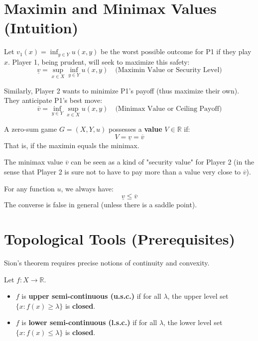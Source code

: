 \section{Maximin and Minimax Values (Intuition)}

Let $v_1(x) = \inf_{y \in Y} u(x, y)$ be the worst possible outcome for P1 if they play $x$.
Player 1, being prudent, will seek to maximize this safety:
$$\underline{v} = \sup_{x \in X} \inf_{y \in Y} u(x, y) \quad \text{(Maximin Value or Security Level)}$$

Similarly, Player 2 wants to minimize P1's payoff (thus maximize their own). They anticipate P1's best move:
$$\overline{v} = \inf_{y \in Y} \sup_{x \in X} u(x, y) \quad \text{(Minimax Value or Ceiling Payoff)}$$

\begin{definition}
A zero-sum game $G=(X, Y, u)$ possesses a \textbf{value} $V \in \mathbb{R}$ if:
$$ V = \underline{v} = \overline{v} $$
That is, if the maximin equals the minimax.
\end{definition}

\begin{remarque}
The minimax value $\overline{v}$ can be seen as a kind of "security value" for Player 2 (in the sense that Player 2 is sure not to have to pay more than a value very close to $\overline{v}$).
\end{remarque}

\begin{proposition}
For any function $u$, we always have:
$$\underline{v} \le \overline{v}$$
The converse is false in general (unless there is a saddle point).
\end{proposition}

\section{Topological Tools (Prerequisites)}
Sion's theorem requires precise notions of continuity and convexity.

\begin{definition}
Let $f: X \to \mathbb{R}$.
\begin{itemize}
    \item $f$ is \textbf{upper semi-continuous (u.s.c.)} if for all $\lambda$, the upper level set $\{x : f(x) \ge \lambda\}$ is \textbf{closed}.
    \item $f$ is \textbf{lower semi-continuous (l.s.c.)} if for all $\lambda$, the lower level set $\{x : f(x) \le \lambda\}$ is \textbf{closed}.
\end{itemize}
\end{definition}


